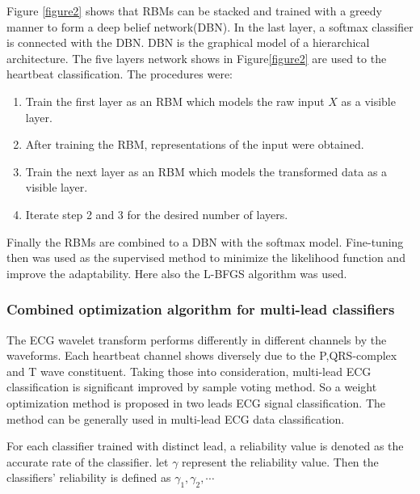 \documentclass{bmcart}
\begin{document}
Figure \ref{figure2} shows that RBMs can be stacked and trained with a greedy manner to form a deep belief network(DBN)\cite{Juergen, Bengio2009}. In the last layer, a softmax classifier is connected with the DBN. DBN is the graphical model of a hierarchical architecture. The five layers network shows in Figure\ref{figure2} are used to the heartbeat classification. The procedures were:
\begin{enumerate}
\item Train the first layer as an RBM which models the raw input $X$ as a visible layer.
\item After training the RBM, representations of the input were obtained.
\item Train the next layer as an RBM which models the transformed data as a visible layer.
\item Iterate step 2 and 3 for the desired number of layers.
\end{enumerate}

Finally the RBMs are combined to a DBN with the softmax model. Fine-tuning then was used as the supervised method to minimize the likelihood function and improve the adaptability. Here also the L-BFGS algorithm was used.

\subsubsection*{Combined optimization algorithm for multi-lead classifiers}
The ECG wavelet transform performs differently in different channels by the waveforms. Each heartbeat channel shows diversely due to the P,QRS-complex and T wave constituent. 
Taking those into consideration, multi-lead ECG classification is significant improved by sample voting method. So a weight optimization method is proposed in two leads ECG signal classification. 
The method can be generally used in multi-lead ECG data classification. 

For each classifier trained with distinct lead, a reliability value is denoted as the accurate rate of the classifier. let $\gamma$ represent the reliability value. Then the classifiers' reliability is defined as $\gamma_1, \gamma_2, \cdots$
\end{document}
